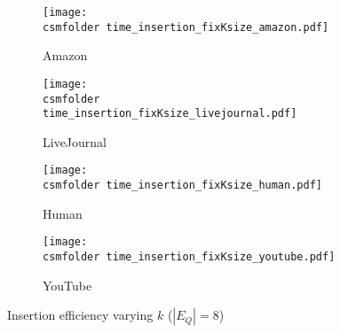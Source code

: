 \begin{figure}[h!]
\def\wscorevone{0.35}
\centering
    \begin{subfigure}[t]{\wscorevone\linewidth}
	    \centering
	    \resizebox{\linewidth}{!}
	    {
	        \texttt{[image: \\csmfolder time\_insertion\_fixKsize\_amazon.pdf]}
	    }
	    \caption{Amazon}
	    \label{fig:time:insertion:fixKsize:amazon}
    \end{subfigure}
    \begin{subfigure}[t]{\wscorevone\linewidth}
        \centering
        \resizebox{\linewidth}{!}
        {
            \texttt{[image: \\csmfolder  time\_insertion\_fixKsize\_livejournal.pdf]}
        }
        \caption{LiveJournal}
        \label{fig:time:insertion:fixKsize:livejournal}
    \end{subfigure}
     \begin{subfigure}[t]{\wscorevone\linewidth}
         \centering
         \resizebox{\linewidth}{!}
         {
             \texttt{[image: \\csmfolder  time\_insertion\_fixKsize\_human.pdf]}
         }
         \caption{Human}
         \label{fig:time:insertion:fixKsize:human}
     \end{subfigure}
     \begin{subfigure}[t]{\wscorevone\linewidth}
         \centering
         \resizebox{\linewidth}{!}
         {
             \texttt{[image: \\csmfolder  time\_insertion\_fixKsize\_youtube.pdf]}
         }
         \caption{YouTube}
         \label{fig:time:insertion:fixKsize:youtube}
     \end{subfigure}
\caption{Insertion efficiency varying $k$ ($|E_Q|=8$)}
\label{fig:time:insertion:fixKsize}
\end{figure}